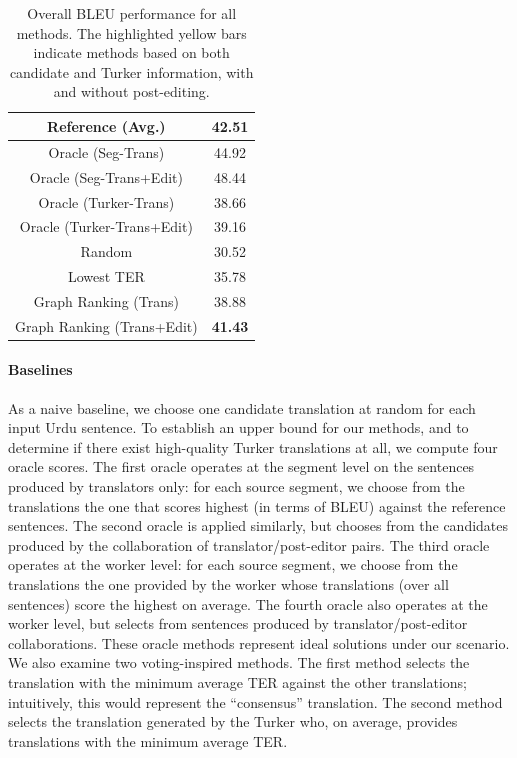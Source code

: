 \documentclass[11pt]{article}
\begin{document}
\begin{table}[t]
\centering
\begin{tabular}{|c||c|} \hline
Reference (Avg.)   &42.51        \\   \hline
Oracle (Seg-Trans)  &44.92	          \\  \hline
Oracle (Seg-Trans+Edit)  &48.44	          \\  \hline
Oracle (Turker-Trans)    &38.66 \\ \hline
Oracle (Turker-Trans+Edit)    &39.16 \\ \hline \hline
Random &30.52  	           \\ \hline
Lowest TER   &35.78  \\  \hline
Graph Ranking (Trans)   &38.88  \\  \hline
Graph Ranking (Trans+Edit)   &\textbf{41.43}  \\  \hline
\end{tabular}
\caption{Overall BLEU performance for all methods. The highlighted yellow bars indicate methods based on both candidate and Turker information, with and without post-editing.}
\label{summary-results}
\end{table}

\paragraph{Baselines}

As a naive baseline, we choose one candidate translation at random for each input Urdu sentence. To establish an upper bound for our methods, and to determine if there exist high-quality Turker translations at all, we compute four oracle scores. The first oracle operates at the segment level on the sentences produced by translators only: for each source segment, we choose from the translations the one that scores highest (in terms of BLEU) against the reference sentences. The second oracle is applied similarly, but chooses from the candidates produced by the collaboration of translator/post-editor pairs. The third oracle operates at the worker level: for each source segment, we choose from the translations the one provided by the worker whose translations (over all sentences) score the highest on average. The fourth oracle also operates at the worker level, but selects from sentences produced by translator/post-editor collaborations. These oracle methods represent ideal solutions under our scenario. We also examine two voting-inspired methods. The first method selects the translation with the minimum average TER \cite{a18} against the other translations; intuitively, this would represent the ``consensus'' translation. The second method selects the translation generated by the Turker who, on average, provides translations with the minimum average TER.
\end{document}
